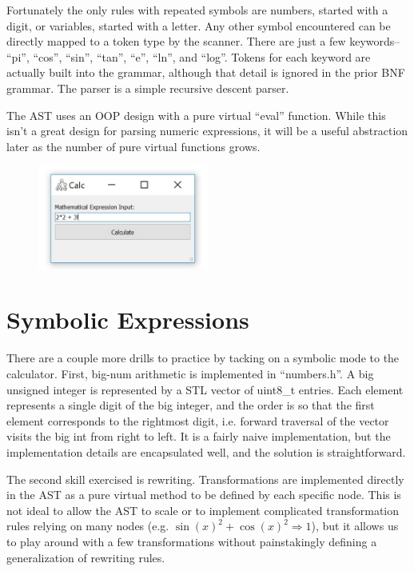 \documentclass[12pt]{article}
\begin{document}
Fortunately the only rules with repeated symbols are numbers, started with a digit, or variables, started with a letter. Any other symbol encountered can be directly mapped to a token type by the scanner. There are just a few keywords-- ``pi'', ``cos'', ``sin'', ``tan'', ``e'', ``ln'', and ``log''. Tokens for each keyword are actually built into the grammar, although that detail is ignored in the prior BNF grammar. The parser is a simple recursive descent parser.

The AST uses an OOP design with a pure virtual ``eval'' function. While this isn't a great design for parsing numeric expressions, it will be a useful abstraction later as the number of pure virtual functions grows.

\begin{figure}[h]
	\centering
		\includegraphics[width=0.50\textwidth]{Fig/Screenshot.jpg}
	\label{fig:screenshot}
\end{figure}

\section{Symbolic Expressions}

There are a couple more drills to practice by tacking on a symbolic mode to the calculator. First, big-num arithmetic is implemented in ``numbers.h''. A big unsigned integer is represented by a STL vector of uint8\_t entries. Each element represents a single digit of the big integer, and the order is so that the first element corresponds to the rightmost digit, i.e. forward traversal of the vector visits the big int from right to left. It is a fairly naive implementation, but the implementation details are encapsulated well, and the solution is straightforward.

The second skill exercised is rewriting. Transformations are implemented directly in the AST as a pure virtual method to be defined by each specific node. This is not ideal to allow the AST to scale or to implement complicated transformation rules relying on many nodes (e.g. $\sin(x)^2 + \cos(x)^2 \Rightarrow 1$), but it allows us to play around with a few transformations without painstakingly defining a generalization of rewriting rules.
\end{document}
